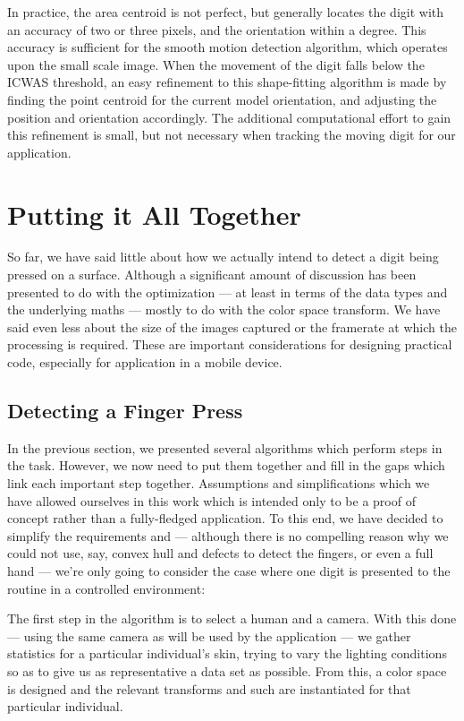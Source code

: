 In practice, the area centroid is not perfect, but generally locates the digit with an accuracy of two or three pixels, and the orientation within a degree. This accuracy is sufficient for the smooth motion detection algorithm, which operates upon the small scale image. When the movement of the digit falls below the ICWAS threshold, an easy refinement to this shape-fitting algorithm is made by finding the point centroid for the current model orientation, and adjusting the position and orientation accordingly. The additional computational effort to gain this refinement is small, but not necessary when tracking the moving digit for our application.

\section{Putting it All Together}\label{sec:PuttingItAllTogether}

So far, we have said little about how we actually intend to detect a digit being pressed on a surface. Although a significant amount of discussion has been presented to do with the optimization --- at least in terms of the data types and the underlying maths --- mostly to do with the color space transform. We have said even less about the size of the images captured or the framerate at which the processing is required. These are important considerations for designing practical code, especially for application in a mobile device.

\subsection{Detecting a Finger Press}\label{sec:DetectingAFingerPress}

In the previous section, we presented several algorithms which perform steps in the task. However, we now need to put them together and fill in the gaps which link each important step together. Assumptions and simplifications which we have allowed ourselves in this work which is intended only to be a proof of concept rather than a fully-fledged application. To this end, we have decided to simplify the requirements and --- although there is no compelling reason why we could not use, say, convex hull and defects to detect the fingers, or even a full hand --- we're only going to consider the case where one digit is presented to the routine in a controlled environment:

The first step in the algorithm is to select a human and a camera. With this done --- using the same camera as will be used by the application --- we gather statistics for a particular individual's skin, trying to vary the lighting conditions so as to give us as representative a data set as possible. From this, a color space is designed and the relevant transforms and such are instantiated for that particular individual.

